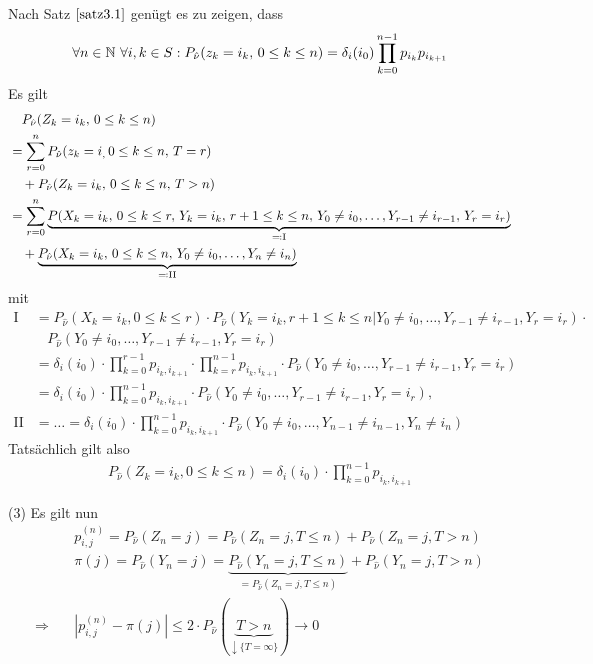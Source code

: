 \documentclass[a4paper,twoside,DIV15,BCOR12mm]{scrbook}
\begin{document}
\begin{beweis}
Nach Satz $\ref{satz3.1}$ genügt es zu zeigen, dass
\[\forall n\in\mathbb{N}\ \forall i,k\in S: P_{\hat\nu}(z_k=i_k,\, 0\le k\le n) = \delta_i(i_0) \prod_{k=0}^{n-1}p_{i_k}p_{i_{k+1}}\]
Es gilt
\begin{align*}
&\quad P_{\hat \nu}(Z_k=i_k,\,0\le k\le n)\\
&= \sum_{r=0}^n P_{\hat \nu}(z_k=i_,\, 0\le k\le n,\, T=r)\\
&\quad + P_{\hat \nu}(Z_k = i_k,\, 0\le k \le n,\, T>n) \\
&= \sum_{r=0}^n \underbrace{P(X_k = i_k,\, 0\le k\le r,\, Y_k=i_k,\, r+1\le k\le n,\, Y_0\ne i_0,\ldots, Y_{r-1}\ne i_{r-1},\, Y_r=i_r)}_{\ad \text{I}} \\
&\quad + \underbrace{P_{\hat \nu}(X_k = i_k, \, 0\le k\le n,\, Y_0\ne i_0,\ldots,Y_n\ne i_n)}_{\ad \text{II}}
\end{align*}
mit
\begin{align*}
  \text{I} &= P_{\hat \nu}(X_k = i_k, 0 \leq k \leq r) \cdot P_{\hat \nu}(Y_k = i_k, r+1 \leq k \leq n | Y_0 \neq i_0, \ldots, Y_{r-1} \neq i_{r-1}, Y_r = i_r) \cdot\\
           &~~~~ P_{\hat \nu}(Y_0 \neq i_0, \ldots, Y_{r-1} \neq i_{r-1}, Y_r = i_r)\\
           &= \delta_i(i_0) \cdot \prod_{k=0}^{r-1} p_{i_k,i_{k+1}} \cdot \prod_{k=r}^{n-1} p_{i_k,i_{k+1}} \cdot P_{\hat \nu}(Y_0 \neq i_0, \ldots, Y_{r-1} \neq i_{r-1}, Y_r = i_r)\\
           &= \delta_i(i_0) \cdot \prod_{k=0}^{n-1} p_{i_k,i_{k+1}} \cdot P_{\hat \nu}(Y_0 \neq i_0, \ldots, Y_{r-1} \neq i_{r-1}, Y_r = i_r),\\
  \text{II} &= \ldots = \delta_i(i_0) \cdot \prod_{k=0}^{n-1} p_{i_k,i_{k+1}} \cdot P_{\hat \nu}(Y_0 \neq i_0, \ldots, Y_{n-1} \neq i_{n-1}, Y_n \neq i_n)
\end{align*}
Tatsächlich gilt also
\begin{align*}
  P_{\hat \nu}(Z_k=i_k, 0 \leq k \leq n) = \delta_i(i_0) \cdot \prod_{k=0}^{n-1} p_{i_k,i_{k+1}}
\end{align*}

(3) Es gilt nun
\begin{align*}
    &p_{i,j}^{(n)} = P_{\hat \nu}(Z_n = j) = P_{\hat \nu}(Z_n = j, T \leq n) + P_{\hat \nu}(Z_n = j, T > n)\\
    &\pi(j) = P_{\hat \nu}(Y_n = j) = \underbrace{P_{\hat \nu}(Y_n = j, T \leq n)}_{= P_{\hat \nu}(Z_n = j, T \leq n)} + P_{\hat \nu}(Y_n = j, T > n)\\
  \Rightarrow \quad &|p_{i,j}^{(n)} - \pi(j)| \leq 2 \cdot P_{\hat \nu}(\underbrace{T > n}_{\downarrow \{T = \infty\}}) \longrightarrow 0
\end{align*}
\end{beweis}
\end{document}
